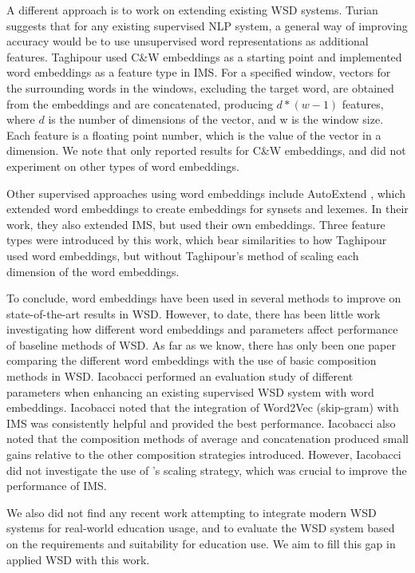 A different approach is to work on extending existing WSD
systems. Turian  suggests that
for any existing supervised NLP system, a general way of improving
accuracy would be to use unsupervised word representations as
additional features. Taghipour  used C\&W
embeddings as a starting point and implemented word embeddings as a
feature type in IMS. For a specified window, vectors for the
surrounding words in the windows, excluding the target word, are
obtained from the embeddings and are concatenated, producing $d *
(w-1)$ features, where $d$ is the number of dimensions of the vector,
and w is the window size. Each feature is a floating point number,
which is the value of the vector in a dimension. We note that
\cite{Taghipour15} only reported results for C\&W embeddings, and did
not experiment on other types of word embeddings.

Other supervised approaches using word embeddings include AutoExtend
\cite{rothe2015autoextend}, which extended word embeddings to create
embeddings for synsets and lexemes. In their work, they also extended
IMS, but used their own embeddings. Three feature types were
introduced by this work, which bear similarities to how Taghipour used
word embeddings, but without Taghipour's method of scaling each
dimension of the word embeddings.


To conclude, word embeddings have been used in several methods to
improve on state-of-the-art results in WSD. However, to date, there
has been little work investigating how different word embeddings and
parameters affect performance of baseline methods of WSD. As far as we
know, there has only been one paper comparing the different word
embeddings with the use of basic composition methods in WSD. Iacobacci
 performed an evaluation study of different
parameters when enhancing an existing supervised WSD system with word
embeddings. Iacobacci noted that the integration of Word2Vec
(skip-gram) with IMS was consistently helpful and provided the best
performance. Iacobacci also noted that the composition methods of
average and concatenation produced small gains relative to the other
composition strategies introduced. However, Iacobacci did not
investigate the use of \cite{Taghipour15}'s scaling strategy, which
was crucial to improve the performance of IMS.

We also did not find any recent work attempting to integrate modern
WSD systems for real-world education usage, and to evaluate the WSD
system based on the requirements and suitability for education use.
We aim to fill this gap in applied WSD with this work.
